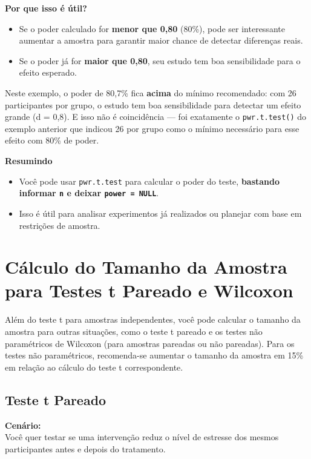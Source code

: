 \documentclass[
]{book}
\providecommand{\tightlist}{%
  \setlength{\itemsep}{0pt}\setlength{\parskip}{0pt}}
\begin{document}
\textbf{Por que isso é útil?}

\begin{itemize}
\tightlist
\item
  Se o poder calculado for \textbf{menor que 0,80} (80\%), pode ser interessante aumentar a amostra para garantir maior chance de detectar diferenças reais.
\item
  Se o poder já for \textbf{maior que 0,80}, seu estudo tem boa sensibilidade para o efeito esperado.
\end{itemize}

Neste exemplo, o poder de 80,7\% fica \textbf{acima} do mínimo recomendado: com 26 participantes por grupo, o estudo tem boa sensibilidade para detectar um efeito grande (d = 0,8). E isso não é coincidência --- foi exatamente o \texttt{pwr.t.test()} do exemplo anterior que indicou 26 por grupo como o mínimo necessário para esse efeito com 80\% de poder.

\textbf{Resumindo}

\begin{itemize}
\tightlist
\item
  Você pode usar \texttt{pwr.t.test} para calcular o poder do teste, \textbf{bastando informar \texttt{n} e deixar \texttt{power\ =\ NULL}}.
\item
  Isso é útil para analisar experimentos já realizados ou planejar com base em restrições de amostra.
\end{itemize}

\section{Cálculo do Tamanho da Amostra para Testes t Pareado e Wilcoxon}\label{cuxe1lculo-do-tamanho-da-amostra-para-testes-t-pareado-e-wilcoxon}

Além do teste t para amostras independentes, você pode calcular o tamanho da amostra para outras situações, como o teste t pareado e os testes não paramétricos de Wilcoxon (para amostras pareadas ou não pareadas). Para os testes não paramétricos, recomenda-se aumentar o tamanho da amostra em 15\% em relação ao cálculo do teste t correspondente.

\subsection{Teste t Pareado}\label{teste-t-pareado-1}

\textbf{Cenário:}\\
Você quer testar se uma intervenção reduz o nível de estresse dos mesmos participantes antes e depois do tratamento.
\end{document}

